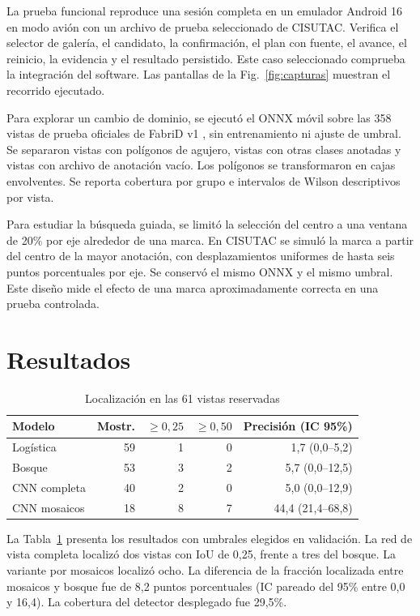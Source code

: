 \documentclass[conference,a4paper]{IEEEtran}
\begin{document}
La prueba funcional reproduce una sesión completa en un emulador Android 16 en modo avión con un archivo de prueba seleccionado de CISUTAC. Verifica el selector de galería, el candidato, la confirmación, el plan con fuente, el avance, el reinicio, la evidencia y el resultado persistido. Este caso seleccionado comprueba la integración del software. Las pantallas de la Fig.~\ref{fig:capturas} muestran el recorrido ejecutado.

Para explorar un cambio de dominio, se ejecutó el ONNX móvil sobre las 358 vistas de prueba oficiales de FabriD v1 \cite{fabrid}, sin entrenamiento ni ajuste de umbral. Se separaron vistas con polígonos de agujero, vistas con otras clases anotadas y vistas con archivo de anotación vacío. Los polígonos se transformaron en cajas envolventes. Se reporta cobertura por grupo e intervalos de Wilson descriptivos por vista.

Para estudiar la búsqueda guiada, se limitó la selección del centro a una ventana de 20\% por eje alrededor de una marca. En CISUTAC se simuló la marca a partir del centro de la mayor anotación, con desplazamientos uniformes de hasta seis puntos porcentuales por eje. Se conservó el mismo ONNX y el mismo umbral. Este diseño mide el efecto de una marca aproximadamente correcta en una prueba controlada.

\section{Resultados}

\begin{table}[!t]
\centering
\caption{Localización en las 61 vistas reservadas}
\label{tab:metricas}
\setlength{\tabcolsep}{4pt}
\begin{tabular}{lrrrr}
\toprule
Modelo & Mostr. & $\geq0{,}25$ & $\geq0{,}50$ & Precisión (IC 95\%) \\
\midrule
Logística & 59 & 1 & 0 & 1,7 (0,0--5,2) \\
Bosque & 53 & 3 & 2 & 5,7 (0,0--12,5) \\
CNN completa & 40 & 2 & 0 & 5,0 (0,0--12,9) \\
CNN mosaicos & 18 & 8 & 7 & 44,4 (21,4--68,8) \\
\bottomrule
\end{tabular}
\end{table}

La Tabla~\ref{tab:metricas} presenta los resultados con umbrales elegidos en validación. La red de vista completa localizó dos vistas con IoU de 0,25, frente a tres del bosque. La variante por mosaicos localizó ocho. La diferencia de la fracción localizada entre mosaicos y bosque fue de 8,2 puntos porcentuales (IC pareado del 95\% entre 0,0 y 16,4). La cobertura del detector desplegado fue 29,5\%.
\end{document}
